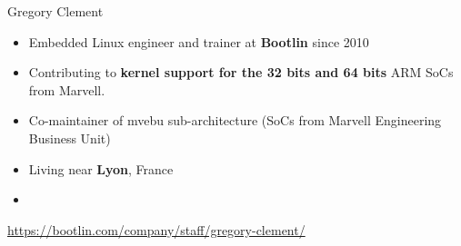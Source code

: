 \begin{frame}{Gregory Clement}
    \begin{itemize}
	\item Embedded Linux engineer and trainer at {\bf Bootlin}
              since 2010
	\item Contributing to {\bf kernel support for the 32 bits and 64 bits} ARM SoCs from Marvell.
	\item Co-maintainer of mvebu sub-architecture (SoCs from Marvell
    	      Engineering Business Unit)
	\item Living near {\bf Lyon}, France
	\item {}
    \end{itemize}
    {\small \url{https://bootlin.com/company/staff/gregory-clement/}}
\end{frame}
